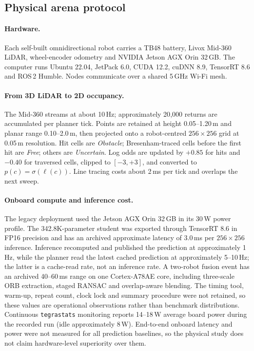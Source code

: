 \documentclass[11pt]{article}
\begin{document}
\subsection{Physical arena protocol} \label{app:realworld}

\paragraph{Hardware.}
Each self-built omnidirectional robot carries a TB48 battery, Livox Mid-360 LiDAR, wheel-encoder odometry and NVIDIA Jetson AGX Orin 32\,GB. The computer runs Ubuntu 22.04, JetPack 6.0, CUDA 12.2, cuDNN 8.9, TensorRT 8.6 and ROS\,2 Humble. Nodes communicate over a shared 5\,GHz Wi-Fi mesh.

\paragraph{From 3D LiDAR to 2D occupancy.}
The Mid-360 streams at about 10\,Hz; approximately 20{,}000 returns are accumulated per planner tick. Points are retained at height 0.05--1.20\,m and planar range 0.10--2.0\,m, then projected onto a robot-centred $256\!\times\!256$ grid at 0.05\,m resolution. Hit cells are \emph{Obstacle}; Bresenham-traced cells before the first hit are \emph{Free}; others are \emph{Uncertain}. Log odds are updated by $+0.85$ for hits and $-0.40$ for traversed cells, clipped to $[-3,+3]$, and converted to $p(c)=\sigma(\ell(c))$. Line tracing costs about 2\,ms per tick and overlaps the next sweep.

\paragraph{Onboard compute and inference cost.}
The legacy deployment used the Jetson AGX Orin 32\,GB in its 30\,W power profile. The 342.8K-parameter student was exported through TensorRT 8.6 in FP16 precision and has an archived approximate latency of 3.0\,ms per $256{\times}256$ inference. Inference recomputed and published the prediction at approximately 1\,Hz, while the planner read the latest cached prediction at approximately 5--10\,Hz; the latter is a cache-read rate, not an inference rate. A two-robot fusion event has an archived 40--60\,ms range on one Cortex-A78AE core, including three-scale ORB extraction, staged RANSAC and overlap-aware blending. The timing tool, warm-up, repeat count, clock lock and summary procedure were not retained, so these values are operational observations rather than benchmark distributions. Continuous \texttt{tegrastats} monitoring reports 14--18\,W average board power during the recorded run (idle approximately 8\,W). End-to-end onboard latency and power were not measured for all prediction baselines, so the physical study does not claim hardware-level superiority over them.
\end{document}
